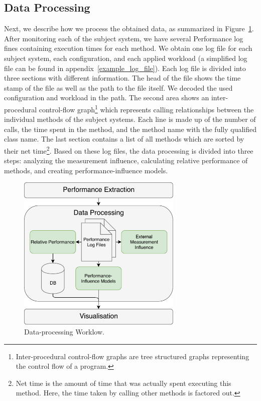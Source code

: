 \subsection{Data Processing}
\label{data_prozessing}

Next, we describe how we process the obtained data, as summarized in Figure~\ref{data_processing_workflow}. After monitoring each of the subject system, we have several Performance log fines containing execution times for each method. We obtain one log file for each subject system, each configuration, and each applied workload (a simplified log file can be found in appendix~\ref{example_log_file}). Each log file is divided into three sections with different information. The head of the file shows the time stamp of the file as well as the path to the file itself. We decoded the used configuration and workload in the path. The second area shows an inter-procedural control-flow graph\footnote{Inter-procedural control-flow graphs are tree structured graphs representing the control flow of a program.} which represents calling relationships between the individual methods of the subject systems. Each line is made up of the number of calls, the time spent in the method, and the method name with the fully qualified class name. The last section contains a list of all methods which are sorted by their net time\footnote{Net time is the amount of time that was actually spent executing this method. Here, the time taken by calling other methods is factored out.}. Based on these log files, the data processing is divided into three steps: analyzing the measurement influence, calculating relative performance of methods, and creating performance-influence models.


\begin{figure}
  \centering
  \includegraphics[width=0.7\textwidth]{images/workflow_data_expanded}
  \caption{Data-processing Worklow.}
  \label{data_processing_workflow}
\end{figure}


